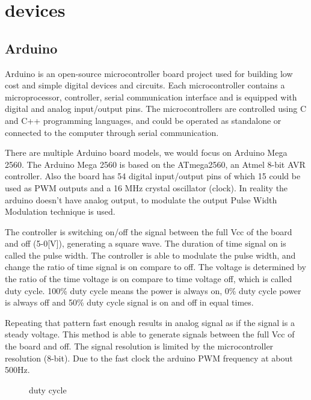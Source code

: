 \documentclass[\main/master.tex]{subfiles}
\begin{document}
\chapter{devices}\label{chp:3}
\doublespacing

\section{Arduino}
Arduino is an open-source microcontroller board project used for building low cost and simple digital devices and circuits. Each microcontroller contains a microprocessor, controller, serial communication interface and is equipped with digital and analog input/output pins. The microcontrollers are controlled using C and C++ programming languages, and could be operated as standalone or connected to the computer through serial communication. 
\par
There are multiple Arduino board models, we would focus on Arduino Mega 2560. The Arduino Mega 2560 is based on the ATmega2560, an Atmel 8-bit AVR controller. Also the board has 54 digital input/output pins of which 15 could be used as PWM outputs and a 16 MHz crystal oscillator (clock). In reality the arduino doesn't have analog output, to modulate the output Pulse Width Modulation technique is used.
\par
The controller is switching on/off the signal between the full Vcc of the board and off (5-0[V]), generating a square wave. The duration of time signal on is called the pulse width. The controller is able to modulate the pulse width, and change the ratio of time signal is on compare to off. The voltage is determined by the ratio of the time voltage is on compare to time voltage off, which is called duty cycle. 100\% duty cycle means the power is always on, 0\% duty cycle power is always off and 50\% duty cycle signal is on and off in equal times. 
\par
Repeating that pattern fast enough results in analog signal as if the signal is a steady voltage. This method is able to generate signals between the full Vcc of the board and off. The signal resolution is limited by the microcontroller resolution (8-bit). Due to the fast clock the arduino PWM frequency at about 500Hz.
\par
\begin{figure}[htbp]
	\centering
	\caption[duty cycle 90\%]{duty cycle}
	\label{fig:sine-wave1}
\end{figure}
\end{document}

